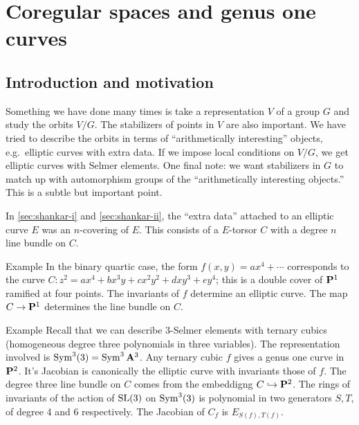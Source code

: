 
\section{Coregular spaces and genus one curves}\label{sec:ho}





\subsection{Introduction and motivation}

Something we have done many times is take a representation $V$ of a group $G$ 
and study the orbits $V/G$. The stabilizers of points in $V$ are also 
important. We have tried to describe the orbits in terms of ``arithmetically 
interesting'' objects, e.g.~elliptic curves with extra data. If we impose 
local conditions on $V/G$, we get elliptic curves with Selmer elements. One 
final note: we want stabilizers in $G$ to match up with automorphism groups of 
the ``arithmetically interesting objects.'' This is a subtle but important 
point. 

In \autoref{sec:shankar-i} and \autoref{sec:shankar-ii}, the ``extra data'' 
attached to an elliptic curve $E$ was an $n$-covering of $E$. This consists 
of a $E$-torsor $C$ with a degree $n$ line bundle on $C$. 

\begin{enonce}[remark]{Example}
In the binary quartic case, the form $f(x,y) = a x^4 + \cdots$ corresponds to 
the curve $C:z^2 = a x^4 + b x^3 y + c x^2 y^2 + d x y^3 + e y^4$; this is a 
double cover of $\mathbf{P}^1$ ramified at four points. The invariants of $f$ 
determine an elliptic curve. The map $C\to \mathbf{P}^1$ determines the line bundle 
on $C$. 
\end{enonce}

\begin{enonce}[remark]{Example}
Recall that we can describe 3-Selmer elements with ternary cubics (homogeneous 
degree three polynomials in three variables). The representation involved 
is $\operatorname{Sym}^3(3) = \operatorname{Sym}^3\mathbf{A}^3$. Any ternary cubic $f$ gives a genus 
one curve in $\mathbf{P}^2$. It's Jacobian is canonically the elliptic curve with 
invariants those of $f$. The degree three line bundle on $C$ comes from the 
embeddigng $C\hookrightarrow \mathbf{P}^2$. The rings of invariants of the action of 
$\operatorname{SL}(3)$ on $\operatorname{Sym}^3(3)$ is polynomial in two generators 
$S,T$, of degree 4 and 6 respectively. The Jacobian of $C_f$ is 
$E_{S(f),T(f)}$. 
\end{enonce}

